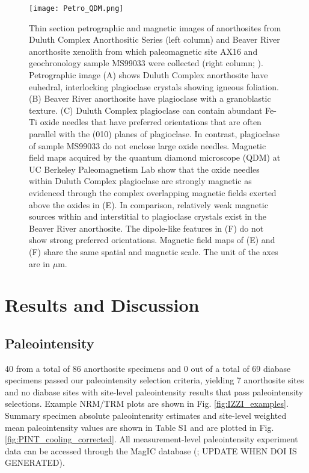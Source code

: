 \documentclass[9pt,twocolumn,twoside,lineno]{pnas-new}
\begin{document}
\begin{figure}
\centering
\noindent\texttt{[image: Petro\_QDM.png]}
\caption{\footnotesize{Thin section petrographic and magnetic images of anorthosites from Duluth Complex Anorthositic Series (left column) and Beaver River anorthosite xenolith from which paleomagnetic site AX16 and geochronology sample MS99033 were collected (right column; \cite{Zhang2021b}). Petrographic image (A) shows Duluth Complex anorthosite have euhedral, interlocking plagioclase crystals showing igneous foliation. (B) Beaver River anorthosite have plagioclase with a granoblastic texture. (C) Duluth Complex plagioclase can contain abundant Fe-Ti oxide needles that have preferred orientations that are often parallel with the (010) planes of plagioclase. In contrast, plagioclase of sample MS99033 do not enclose large oxide needles. Magnetic field maps acquired by the quantum diamond microscope (QDM) at UC Berkeley Paleomagnetism Lab show that the oxide needles within Duluth Complex plagioclase are strongly magnetic as evidenced through the complex overlapping magnetic fields exerted above the oxides in (E). In comparison, relatively weak magnetic sources within and interstitial to plagioclase crystals exist in the Beaver River anorthosite. The dipole-like features in (F) do not show strong preferred orientations. Magnetic field maps of (E) and (F) share the same spatial and magnetic scale. The unit of the axes are in $\mu$m.}}
\label{fig:Petro_QDM}
\end{figure}


\section*{Results and Discussion}

\subsection*{Paleointensity}

40 from a total of 86 anorthosite specimens and 0 out of a total of 69 diabase specimens passed our paleointensity selection criteria, yielding 7 anorthosite sites and no diabase sites with site-level paleointensity results that pass paleointensity selections. Example NRM/TRM plots 
\cite{Arai1963a} are shown in Fig. \ref{fig:IZZI_examples}. Summary specimen absolute paleointensity estimates and site-level weighted mean paleointensity values are shown in Table S1 and are plotted in Fig. \ref{fig:PINT_cooling_corrected}. All measurement-level paleointensity experiment data can be accessed through the MagIC database (\url{}; UPDATE WHEN DOI IS GENERATED). 
\end{document}
